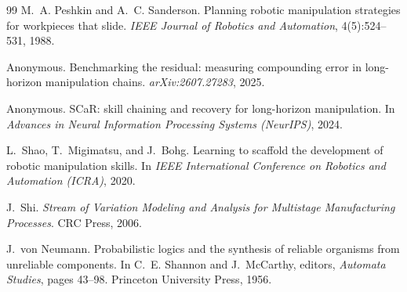 \documentclass[11pt]{article}
\begin{document}
\begin{thebibliography}{99}
M.~A. Peshkin and A.~C. Sanderson.
\newblock Planning robotic manipulation strategies for workpieces that slide.
\newblock \emph{IEEE Journal of Robotics and Automation}, 4(5):524--531,
1988.

Anonymous.
\newblock Benchmarking the residual: measuring compounding error in
long-horizon manipulation chains.
\newblock \emph{arXiv:2607.27283}, 2025.

Anonymous.
\newblock SCaR: skill chaining and recovery for long-horizon manipulation.
\newblock In \emph{Advances in Neural Information Processing Systems
(NeurIPS)}, 2024.

L.~Shao, T.~Migimatsu, and J.~Bohg.
\newblock Learning to scaffold the development of robotic manipulation
skills.
\newblock In \emph{IEEE International Conference on Robotics and Automation
(ICRA)}, 2020.

J.~Shi.
\newblock \emph{Stream of Variation Modeling and Analysis for Multistage
Manufacturing Processes}.
\newblock CRC Press, 2006.

J.~von Neumann.
\newblock Probabilistic logics and the synthesis of reliable organisms from
unreliable components.
\newblock In C.~E. Shannon and J.~McCarthy, editors, \emph{Automata
Studies}, pages 43--98. Princeton University Press, 1956.

\end{thebibliography}
\end{document}
